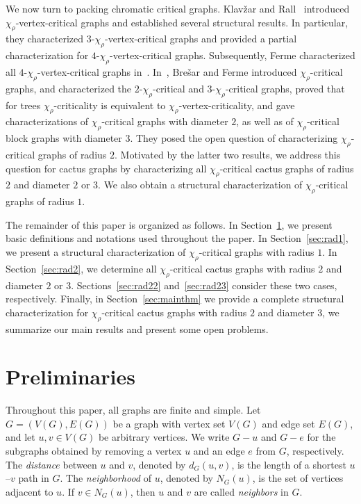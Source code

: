 \documentclass[12pt]{article}
\begin{document}
We now turn to packing chromatic critical graphs. Klav\v{z}ar and Rall~\cite{klavzar-2019} introduced $\chi_{\rho}$-vertex-critical graphs and established several structural results. In particular, they characterized $3$-$\chi_{\rho}$-vertex-critical graphs and provided a partial characterization for $4$-$\chi_{\rho}$-vertex-critical graphs.
Subsequently, Ferme characterized all $4$-$\chi_{\rho}$-vertex-critical graphs in~\cite{ferme-2022}. 
In~\cite{bresar-2022}, Bre\v{s}ar and Ferme introduced $\chi_{\rho}$-critical graphs, and characterized the $2$-$\chi_{\rho}$-critical and $3$-$\chi_{\rho}$-critical graphs, proved that for trees $\chi_{\rho}$-criticality is equivalent to $\chi_{\rho}$-vertex-criticality, and gave characterizations of $\chi_{\rho}$-critical graphs with diameter $2$, as well as of $\chi_{\rho}$-critical block graphs with diameter $3$. They posed the open question of characterizing $\chi_\rho$-critical graphs of radius $2$. Motivated by the latter two results, we address this question for cactus graphs by characterizing all $\chi_{\rho}$-critical cactus graphs of radius $2$ and diameter $2$ or $3$. We also obtain a structural characterization of $\chi_{\rho}$-critical graphs of radius $1$.

The remainder of this paper is organized as follows. In Section~\ref{sec:pre}, we present basic definitions and notations used throughout the paper. In Section~\ref{sec:rad1}, we present a structural characterization of $\chi_{\rho}$-critical graphs with radius $1$. In Section~\ref{sec:rad2}, we determine all $\chi_{\rho}$-critical cactus graphs with radius $2$ and diameter $2$ or $3$. Sections~\ref{sec:rad22} and~\ref{sec:rad23} consider these two cases, respectively. Finally, in Section~\ref{sec:mainthm} we provide a complete structural characterization for $\chi_{\rho}$-critical cactus graphs with radius $2$ and diameter $3$, we summarize our main results and present some open problems.

\section{Preliminaries} \label{sec:pre}

Throughout this paper, all graphs are finite and simple. Let $G = (V(G), E(G))$ be a graph with vertex set $V(G)$ and edge set $E(G)$, and let $u, v \in V(G)$ be arbitrary vertices.
We write $G-u$ and $G-e$ for the subgraphs obtained by removing a vertex $u$ and an edge $e$ from $G$, respectively. 
The \emph{distance} between $u$ and $v$, denoted by $d_G(u,v)$, is the length of a shortest $u$--$v$ path in $G$.
The \emph{neighborhood} of $u$, denoted by $N_G(u)$, is the set of vertices adjacent to $u$. If $v\in N_G(u)$, then $u$ and $v$ are called \emph{neighbors} in $G$. 
\end{document}
